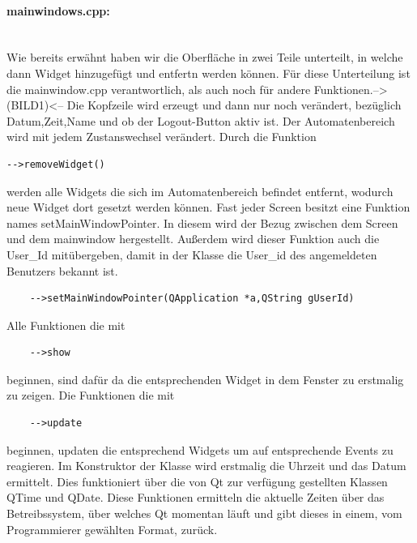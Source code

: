 \documentclass[11pt,a4paper]{article} %
\begin{document}
\paragraph{mainwindows.cpp:} $\;$ \\
	Wie bereits erwähnt haben wir die Oberfläche in zwei Teile unterteilt, in welche dann Widget hinzugefügt und entfertn werden können. 
	Für diese Unterteilung ist die mainwindow.cpp verantwortlich, als auch noch für andere Funktionen.-->(BILD1)<--
	Die Kopfzeile wird erzeugt und dann nur noch verändert, bezüglich Datum,Zeit,Name und ob der Logout-Button aktiv ist.
	Der Automatenbereich wird mit jedem Zustanswechsel verändert.
	Durch die Funktion 
	\begin{frame}

\begin{lstlisting}
-->removeWidget()
\end{lstlisting}
\end{frame}
werden alle Widgets die sich im Automatenbereich befindet entfernt, wodurch neue Widget dort gesetzt werden können.
	Fast jeder Screen besitzt eine Funktion names setMainWindowPointer. In diesem wird der Bezug zwischen dem Screen und dem mainwindow hergestellt.
	Außerdem wird dieser Funktion auch die User\_Id mitübergeben, damit in der Klasse die User\_id des angemeldeten Benutzers bekannt ist.
	\begin{frame}

\begin{lstlisting}
	-->setMainWindowPointer(QApplication *a,QString gUserId)
	\end{lstlisting}
\end{frame}
	
	Alle Funktionen die mit 
	\begin{frame}

\begin{lstlisting}
	-->show
	\end{lstlisting}
\end{frame}
	beginnen, sind dafür da die entsprechenden Widget in dem Fenster zu erstmalig zu zeigen.
	Die Funktionen die mit 
	\begin{frame}

\begin{lstlisting}
	-->update
	\end{lstlisting}
\end{frame}
	beginnen, updaten die entsprechend Widgets um auf entsprechende Events zu reagieren.
	Im Konstruktor der Klasse wird erstmalig die Uhrzeit und das Datum ermittelt. Dies funktioniert über die von Qt zur verfügung gestellten Klassen QTime und QDate.
	Diese Funktionen ermitteln die aktuelle Zeiten über das Betreibssystem, über welches Qt momentan läuft und gibt dieses in einem, vom Programmierer gewählten Format, zurück.
	
\end{document}
